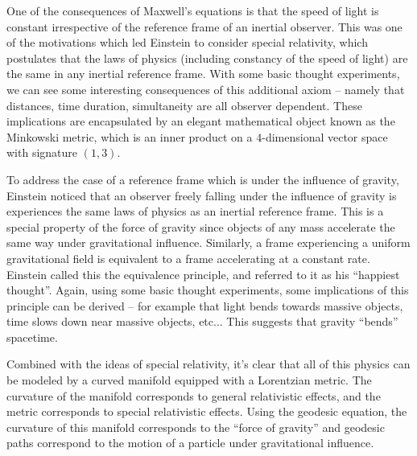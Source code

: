 \documentclass{../../templates/lkx_pset}
\begin{document}
\begin{solution}
	One of the consequences of Maxwell's equations is that the speed of light is constant irrespective of the reference frame of an inertial observer. This was one of the motivations which led Einstein to consider special relativity, which postulates that the laws of physics (including constancy of the speed of light) are the same in any inertial reference frame. With some basic thought experiments, we can see some interesting consequences of this additional axiom -- namely that distances, time duration, simultaneity are all observer dependent. These implications are encapsulated by an elegant mathematical object known as the Minkowski metric, which is an inner product on a $4$-dimensional vector space with signature $(1,3)$.

	To address the case of a reference frame which is under the influence of gravity, Einstein noticed that an observer freely falling under the influence of gravity is experiences the same laws of physics as an inertial reference frame. This is a special property of the force of gravity since objects of any mass accelerate the same way under gravitational influence. Similarly, a frame experiencing a uniform gravitational field is equivalent to a frame accelerating at a constant rate. Einstein called this the equivalence principle, and referred to it as his ``happiest thought''. Again, using some basic thought experiments, some implications of this principle can be derived -- for example that light bends towards massive objects, time slows down near massive objects, etc...
	This suggests that gravity ``bends'' spacetime.

	Combined with the ideas of special relativity, it's clear that all of this physics can be modeled by a curved manifold equipped with a Lorentzian metric. The curvature of the manifold corresponds to general relativistic effects, and the metric corresponds to special relativistic effects. Using the geodesic equation, the curvature of this manifold corresponds to the ``force of gravity'' and geodesic paths correspond to the motion of a particle under gravitational influence.


\end{solution}
\end{document}

